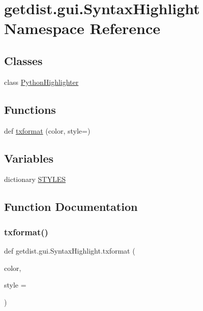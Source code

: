 \hypertarget{namespacegetdist_1_1gui_1_1SyntaxHighlight}{}\section{getdist.\+gui.\+Syntax\+Highlight Namespace Reference}
\label{namespacegetdist_1_1gui_1_1SyntaxHighlight}
\subsection*{Classes}
\begin{DoxyCompactItemize}
\item 
class \mbox{\hyperlink{classgetdist_1_1gui_1_1SyntaxHighlight_1_1PythonHighlighter}{Python\+Highlighter}}
\end{DoxyCompactItemize}
\subsection*{Functions}
\begin{DoxyCompactItemize}
\item 
def \mbox{\hyperlink{namespacegetdist_1_1gui_1_1SyntaxHighlight_ab6a70a500e0d1fb3fa52b25fb15b3dae}{txformat}} (color, style=\textquotesingle{}\textquotesingle{})
\end{DoxyCompactItemize}
\subsection*{Variables}
\begin{DoxyCompactItemize}
\item 
dictionary \mbox{\hyperlink{namespacegetdist_1_1gui_1_1SyntaxHighlight_a57ea3dde90816b4dfb1f960228f131b8}{S\+T\+Y\+L\+ES}}
\end{DoxyCompactItemize}


\subsection{Function Documentation}
\mbox{\label{namespacegetdist_1_1gui_1_1SyntaxHighlight_ab6a70a500e0d1fb3fa52b25fb15b3dae}} 
\subsubsection{\texorpdfstring{txformat()}{txformat()}}
{\footnotesize\ttfamily def getdist.\+gui.\+Syntax\+Highlight.\+txformat (\begin{DoxyParamCaption}\item[{}]{color,  }\item[{}]{style = {\ttfamily \textquotesingle{}\textquotesingle{}} }\end{DoxyParamCaption})}

